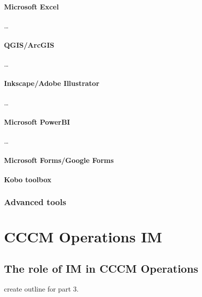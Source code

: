 \documentclass[letterpaper,10pt,english]{jupyterBook}
\begin{document}
\subsection{Microsoft Excel}
\label{\detokenize{part1/tools:microsoft-excel}}
\sphinxAtStartPar
…


\subsection{QGIS/ArcGIS}
\label{\detokenize{part1/tools:qgis-arcgis}}
\sphinxAtStartPar
…


\subsection{Inkscape/Adobe Illustrator}
\label{\detokenize{part1/tools:inkscape-adobe-illustrator}}
\sphinxAtStartPar
…


\subsection{Microsoft PowerBI}
\label{\detokenize{part1/tools:microsoft-powerbi}}
\sphinxAtStartPar
…


\subsection{Microsoft Forms/Google Forms}
\label{\detokenize{part1/tools:microsoft-forms-google-forms}}

\subsection{Kobo toolbox}
\label{\detokenize{part1/tools:kobo-toolbox}}

\section{Advanced tools}
\label{\detokenize{part1/tools:advanced-tools}}

\part{CCCM Operations IM}


\chapter{The role of IM in CCCM Operations}
\label{\detokenize{part2/operations:the-role-of-im-in-cccm-operations}}\label{\detokenize{part2/operations::doc}}
\sphinxAtStartPar
{} create outline for part 3.
\end{document}

